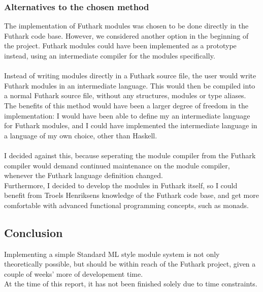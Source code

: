 \subsubsection{Alternatives to the chosen method}
The implementation of Futhark modules was chosen to be done directly in the
Futhark code base.
However, we considered another option in the beginning of the project.
Futhark modules could have been implemented as a prototype instead, using an
intermediate compiler for the modules specifically.
\\
\\
Instead of writing modules directly in a Futhark source file, the user would
write Futhark modules in an intermediate language.
This would then be compiled into a normal Futhark source file, without any structures, modules or type aliases.
\\
The benefits of this method would have been a larger degree of freedom in the
implementation: I would have been able to define my an intermediate language for Futhark
modules, and I could have implemented the intermediate language in a language of
my own choice, other than Haskell.
\\
\\
I decided against this, because seperating the module compiler from the Futhark
compiler would demand continued maintenance on the module compiler, whenever the
Futhark language definition changed.\\
Furthermore, I decided to develop the modules in Futhark itself, so I could
benefit from Troels Henriksens knowledge of the Futhark code base, and get more
comfortable with advanced functional programming concepts, such as monads.

\subsection{Conclusion}
Implementing a simple Standard ML style module system is not only theoretically
possible, but should be within reach of the Futhark project, given a couple of
weeks' more of developement time.
\\
At the time of this report, it has not been finished solely due to time constraints.
\\
\\

